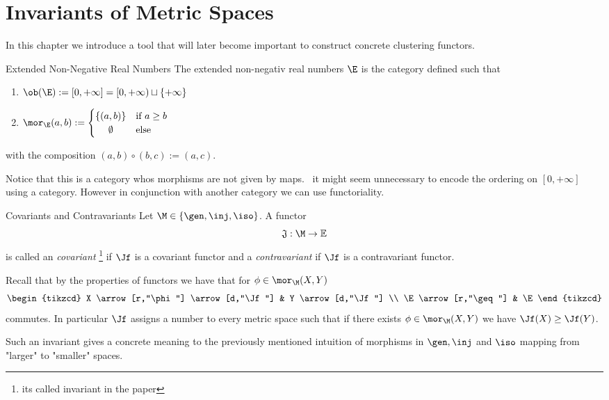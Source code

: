 \chapter{Invariants of Metric Spaces}

In this chapter we introduce a tool that will later become important to construct concrete clustering functors.

\begin{definition}{Extended Non-Negative Real Numbers}{}
The extended non-negativ real numbers $\E$ is the category defined such that
\begin{enumerate}
    \item $\ob(\E) := [0, +\infty] = [0, +\infty) \sqcup \{+\infty\}$
    \item $\mor_\E(a,b) := \begin{cases}
        \{(a,b)\} & \text{if $a \geq b$} \\
        \hfil \emptyset & \text{else}
    \end{cases}$
\end{enumerate}
with the composition $(a,b) \circ (b,c) := (a,c)$.
\end{definition}
Notice that this is a category whos morphisms are not given by maps. \Apriori\ it might seem unnecessary to encode the ordering on $[0, +\infty]$ using a category. However in conjunction with another category we can use functoriality.

\begin{definition}{Covariants and Contravariants}{}
Let $\M \in \{\gen, \inj, \iso\}$. A functor
$$\mathfrak{J}: \M \to \mathbb{E}$$
is called an \emph{covariant}
\footnote{its called invariant in the paper}
if $\Jf$ is a covariant functor and a \emph{contravariant} if $\Jf$ is a contravariant functor.
\end{definition}

\begin{myremark}{}{}
Recall that by the properties of functors we have that for $\phi \in \mor_\M(X,Y)$
\begin{equation*}
\begin{tikzcd}
X \arrow[r,"\phi"] \arrow[d,"\Jf"] & Y \arrow[d,"\Jf"] \\
\E \arrow[r,"\geq"]              & \E   
\end{tikzcd}       
\end{equation*}
commutes. In particular $\Jf$ assigns a number to every metric space such that if there exists $\phi \in \mor_\M(X,Y)$ we have $\Jf(X) \geq \Jf(Y)$.
\end{myremark}
Such an invariant gives a concrete meaning to the previously mentioned intuition of morphisms in $\gen, \inj$ and $\iso$ mapping from "larger" to "smaller" spaces.

